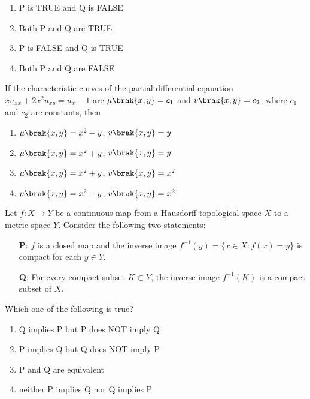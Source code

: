 \begin{enumerate}
    \item P is TRUE and Q is FALSE
    \item Both P and Q are TRUE
    \item P is FALSE and Q is TRUE
    \item Both P and Q are FALSE
\end{enumerate}
\vspace{0.5cm}
\item If the characteristic curves of the partial differential eqauation $xu_{xx}+2x^2u_{xy}=u_{x}-1$ are $\mu\brak{x,y}=c_1$ and $v\brak{x,y}=c_2$, where $c_1$ and $c_2$ are constants, then 
\begin{enumerate}
    \item $\mu\brak{x,y}=x^2-y$, $v\brak{x,y}=y$\item  $\mu\brak{x,y}=x^2+y$, $v\brak{x,y}=y$
    \item  $\mu\brak{x,y}=x^2+y$, $v\brak{x,y}=x^2$
    \item  $\mu\brak{x,y}=x^2-y$, $v\brak{x,y}=x^2$
\end{enumerate}

\vspace{0.5cm}
\item Let \( f : X \to Y \) be a continuous map from a Hausdorff topological space \( X \) to a metric space \( Y \). Consider the following two statements:

\begin{itemize}
    \item[\textbf{P}:] \( f \) is a closed map and the inverse image \( f^{-1}(y) = \{x \in X : f(x) = y\} \) is compact for each \( y \in Y \).
    \item[\textbf{Q}:] For every compact subset \( K \subset Y \), the inverse image \( f^{-1}(K) \) is a compact subset of \( X \).
\end{itemize}

Which one of the following is true?

\begin{enumerate}
    \item Q implies P but P does NOT imply Q
    \item P implies Q but Q does NOT imply P
    \item P and Q are equivalent
    \item neither P implies Q nor Q implies P
\end{enumerate}
\vspace{0.5cm}

